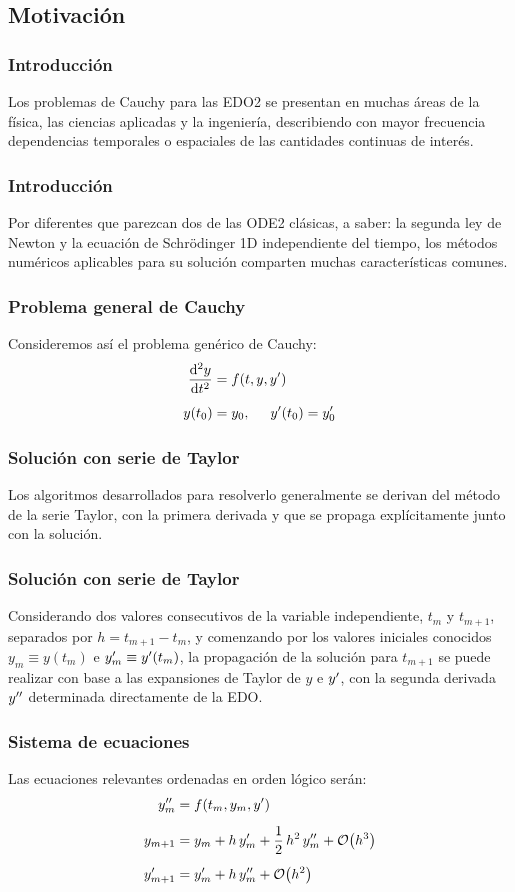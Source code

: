 \subsection{Motivación}
\begin{frame}
\frametitle{Introducción}
Los problemas de Cauchy para las EDO2 se presentan en muchas áreas de la física, las ciencias aplicadas y la ingeniería, describiendo con mayor frecuencia dependencias temporales o espaciales de las cantidades continuas de interés.
\end{frame}
\begin{frame}
\frametitle{Introducción}
Por diferentes que parezcan dos de las ODE2 clásicas, a saber: la segunda ley de Newton y la ecuación de Schrödinger 1D independiente del tiempo, los métodos numéricos aplicables para su solución comparten muchas características comunes.
\end{frame}
\begin{frame}
\frametitle{Problema general de Cauchy}
Consideremos así el problema genérico de Cauchy:
\begin{align}
\dv[2]{y}{t} &= f(t, y, {y}^{\prime}) \label{eq:ecuacion_12_54} \\[0.5em]
y(t_{0}) &= y_{0}, \hspace{0.5cm} {y}^{\prime} (t_{0}) = {y}^{\prime}_{0} \label{eq:ecuacion_12_55}
\end{align}
\end{frame}
\begin{frame}
\frametitle{Solución con serie de Taylor}
Los algoritmos desarrollados para resolverlo generalmente se derivan del método de la serie Taylor, con la primera derivada y que se propaga explícitamente junto con la solución.
\end{frame}
\begin{frame}
\frametitle{Solución con serie de Taylor}
Considerando dos valores consecutivos de la variable independiente, $t_{m}$ y $t_{m + 1}$, separados por $h = t_{m+1} - t_{m}$, y comenzando por los valores iniciales conocidos $y_{m} \equiv y (t_{m})$ e ${y}^{\prime}_{m} \equiv {y}^{\prime} (t_{m})$, la propagación de la solución para $t_{m + 1}$ se puede realizar con base a las expansiones de Taylor de $y$ e ${y}^{\prime}$, con la segunda derivada ${y}^{\prime \prime}$ determinada directamente de la EDO.
\end{frame}
\begin{frame}
\frametitle{Sistema de ecuaciones}
Las ecuaciones relevantes ordenadas en orden lógico serán:
\begin{align}
\begin{aligned}
\stilde{y}_{m} &= f(t_{m}, y_{m}, \ptilde{y}) \\[0.5em]
y_{m+1} &= y_{m} + h \, \ptilde{y}_{m} + \dfrac{1}{2} \, h^{2} \, \stilde{y}_{m} + \order{h^{3}} \\[0.5em]
\ptilde{y}_{m+1} &= \ptilde{y}_{m} + h \, \stilde{y}_{m} + \order{h^{2}}
\end{aligned}
\label{eq:eq:ecuacion_12_56}
\end{align}
\end{frame}
